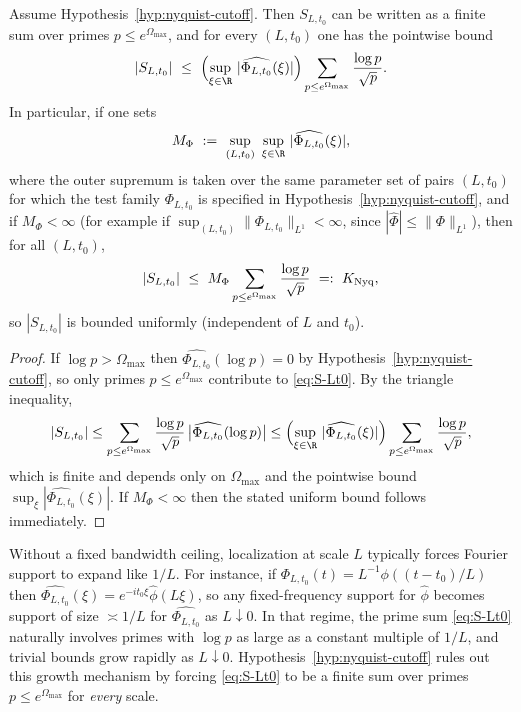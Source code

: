 \documentclass[11pt]{article}
\begin{document}
\begin{lemma}\label{lem:nyquist-implies-blocker}
Assume Hypothesis~\ref{hyp:nyquist-cutoff}.
Then $S_{L,t_0}$ can be written as a finite sum over primes $p\le e^{\Omega_{\max}}$, and for every $(L,t_0)$ one has the pointwise bound
\[
  |S_{L,t_0}|\ \le\
  \Bigl(\sup_{\xi\in\R}\,|\widehat{\Phi_{L,t_0}}(\xi)|\Bigr)
  \sum_{p\le e^{\Omega_{\max}}}\frac{\log p}{\sqrt{p}}.
\]
In particular, if one sets
\[
  M_\Phi\ :=\ \sup_{(L,t_0)}\ \sup_{\xi\in\R}\,|\widehat{\Phi_{L,t_0}}(\xi)|,
\]
where the outer supremum is taken over the same parameter set of pairs $(L,t_0)$ for which the test family $\Phi_{L,t_0}$ is specified in Hypothesis~\ref{hyp:nyquist-cutoff},
and if $M_\Phi<\infty$ (for example if $\sup_{(L,t_0)}\|\Phi_{L,t_0}\|_{L^1}<\infty$, since $|\widehat{\Phi}|\le \|\Phi\|_{L^1}$),
then for all $(L,t_0)$,
\[
  |S_{L,t_0}|\ \le\ M_\Phi\sum_{p\le e^{\Omega_{\max}}}\frac{\log p}{\sqrt{p}}\ =:\ K_{\rm Nyq},
\]
so $|S_{L,t_0}|$ is bounded uniformly (independent of $L$ and $t_0$).
\end{lemma}
\begin{proof}
If $\log p>\Omega_{\max}$ then $\widehat{\Phi_{L,t_0}}(\log p)=0$ by Hypothesis~\ref{hyp:nyquist-cutoff}, so only primes $p\le e^{\Omega_{\max}}$ contribute to \eqref{eq:S-Lt0}.
By the triangle inequality,
\[
  |S_{L,t_0}|
  \le
  \sum_{p\le e^{\Omega_{\max}}}\frac{\log p}{\sqrt{p}}\,\bigl|\widehat{\Phi_{L,t_0}}(\log p)\bigr|
  \le
  \Bigl(\sup_{\xi\in\R}\,|\widehat{\Phi_{L,t_0}}(\xi)|\Bigr)\sum_{p\le e^{\Omega_{\max}}}\frac{\log p}{\sqrt{p}},
\]
which is finite and depends only on $\Omega_{\max}$ and the pointwise bound $\sup_{\xi}|\widehat{\Phi_{L,t_0}}(\xi)|$.
If $M_\Phi<\infty$ then the stated uniform bound follows immediately.
\end{proof}

\begin{remark}\label{rem:why-cutoff}
Without a fixed bandwidth ceiling, localization at scale $L$ typically forces Fourier support to expand like $1/L$.
For instance, if $\Phi_{L,t_0}(t)=L^{-1}\phi((t-t_0)/L)$ then $\widehat{\Phi_{L,t_0}}(\xi)=e^{-it_0\xi}\widehat{\phi}(L\xi)$, so any fixed-frequency support for $\widehat{\phi}$ becomes support of size $\asymp 1/L$ for $\widehat{\Phi_{L,t_0}}$ as $L\downarrow 0$.
In that regime, the prime sum \eqref{eq:S-Lt0} naturally involves primes with $\log p$ as large as a constant multiple of $1/L$, and trivial bounds grow rapidly as $L\downarrow 0$.
Hypothesis~\ref{hyp:nyquist-cutoff} rules out this growth mechanism by forcing \eqref{eq:S-Lt0} to be a finite sum over primes $p\le e^{\Omega_{\max}}$ for \emph{every} scale.
\end{remark}
\end{document}
